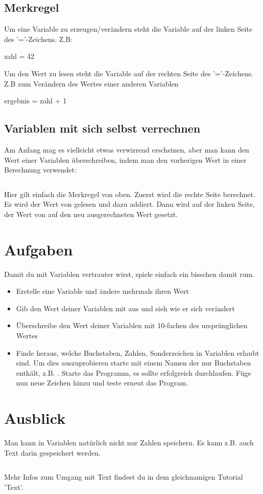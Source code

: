 \documentclass{\VorlagenPfad/coderdojokatext}
\begin{document}
\subsection{Merkregel}
\begin{merkbox}
Um eine Variable zu erzeugen/verändern steht die Variable auf der linken Seite des '='-Zeichens. Z.B:
\begin{pythoncode}
zahl = 42
\end{pythoncode}
Um den Wert zu lesen steht die Variable auf der rechten Seite des '='-Zeichens. Z.B zum Verändern des Wertes einer anderen Variablen
\begin{pythoncode}
ergebnis = zahl + 1
\end{pythoncode}

\end{merkbox}

\subsection{Variablen mit sich selbst verrechnen}
Am Anfang mag es vielleicht etwas verwirrend erscheinen, aber man kann den Wert einer Variablen überschreiben, indem man den vorherigen Wert in einer Berechnung verwendet:

\inputminted[firstline=23, lastline=26]{python}{../../../Beispiele/variablen.py}
Hier gilt einfach die Merkregel von oben. Zuerst wird die rechte Seite berechnet. Es wird der Wert von  gelesen und  dazu addiert. Dann wird auf der linken Seite, der Wert von  auf den neu ausgerechneten Wert gesetzt.

\section{Aufgaben}
Damit du mit Variablen vertrauter wirst, spiele einfach ein bisschen damit rum.
\begin{itemize}
	\item Erstelle eine Variable und ändere mehrmals ihren Wert
	\item Gib den Wert deiner Variablen mit  aus und sieh wie er sich verändert
	\item Überschreibe den Wert deiner Variablen mit 10-fachen des ursprünglichen Wertes
	\item Finde heraus, welche Buchstaben, Zahlen, Sonderzeichen in Variablen erlaubt sind. Um dies auszuprobieren starte mit einem Namen der nur Buchstaben enthält, z.B. . Starte das Programm, es sollte erfolgreich durchlaufen. Füge nun neue Zeichen hinzu und teste erneut das Program. 
\end{itemize}

\section{Ausblick}
Man kann in Variablen natürlich nicht nur Zahlen speichern. Es kann z.B. auch Text darin gespeichert werden.
\inputminted[firstline=28, lastline=31]{python}{../../../Beispiele/variablen.py}
Mehr Infos zum Umgang mit Text findest du in dem gleichnamigen Tutorial 'Text'.
\end{document}

